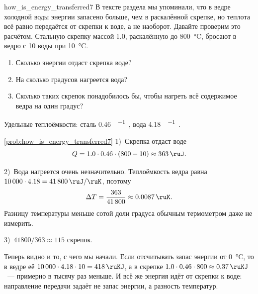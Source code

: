 \begin{problem}{}{how_is_energy_transferred7}
    В тексте раздела мы упоминали, что в ведре холодной воды энергии запасено больше, чем в раскалённой скрепке, но теплота всё равно передаётся от скрепки к воде, а не наоборот. Давайте проверим это расчётом. Стальную скрепку массой \qty{1,0}{\ruG}, раскалённую до \qty{800}{\degreeCelsius}, бросают в ведро с \qty{10}{\ruL} воды при \qty{10}{\degreeCelsius}.

    \begin{enumerate}[label=\arabic*)]
        \item Сколько энергии отдаст скрепка воде?
        \item На сколько градусов нагреется вода?
        \item Сколько таких скрепок понадобилось бы, чтобы нагреть всё содержимое ведра на один градус?
    \end{enumerate}

    Удельные теплоёмкости: сталь \qty{0,46}{\ruJ\per\ruG\ruK}, вода \qty{4,18}{\ruJ\per\ruG\ruK}.
    \begin{sol}{\ref{prob:how_is_energy_transferred7}}
        1)~Скрепка отдаст воде
        \begin{equation*}
            Q = \num{1,0} \cdot \num{0,46} \cdot (\num{800} - \num{10}) \approx \qty{363}{\ruJ}.
        \end{equation*}

        2)~Вода нагреется очень незначительно. Теплоёмкость ведра равна $\num{10000} \cdot \num{4,18} = \qty{41800}{\ruJ\per\ruK}$, поэтому
        \begin{equation*}
            \Delta T = \frac{\num{363}}{\num{41800}} \approx \qty{0,0087}{\ruK}.
        \end{equation*}
        Разницу температуры меньше сотой доли градуса обычным термометром даже не измерить.

        3)~$\num{41800} / \num{363} \approx 115$ скрепок.

        Теперь видно и то, с чего мы начали. Если отсчитывать запас энергии от \qty{0}{\degreeCelsius}, то в ведре её $\num{10000} \cdot \num{4,18} \cdot \num{10} = \qty{418}{\ruKJ}$, а в скрепке $\num{1,0} \cdot \num{0,46} \cdot \num{800} \approx \qty{0,37}{\ruKJ}$~--- примерно в тысячу раз меньше. И всё же энергия идёт от скрепки к воде: направление передачи задаёт не запас энергии, а разность температур.
    \end{sol}
\end{problem}

